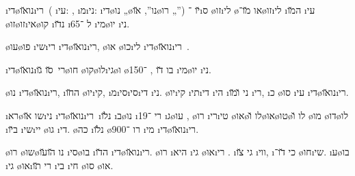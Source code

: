 \newcommand{\dinozaurim}{\i{די}\o{נו}\u{או}\i{רי}\s{ם}}

\dinozaurim\ ( \i{עי}: , \i{מ}\i{ני}:  \i{די}\o{נו} „\o{נו}”,  \u{או}\o{רו} „”) \u{יו} ־\i{ס}  \o{זו}\i{לי} \o{או} \u{מו}־\o{זו}\i{לי} \i{ה}\u{מו} \i{עי} \o{זו}\o{זו}\i{אי}\o{קו} \i{נ}\u{דו} \i{ל} ־65 \i{מי}\o{יו} \i{ני}.

\o{עו}\o{פו}   \i{שי}\i{רי}  \dinozaurim, \o{או}  \o{כו}\i{לי}  \dinozaurim\ .

\dinozaurim\ \u{סו} \u{גו}\o{חו} \o{קו}\o{לו}\i{גי}\o{ו} \o{בו}   \u{דו} ,  ־150 \i{מי}\o{יו} \i{ני}.

\o{נו} \dinozaurim, \i{ה}\u{חו} \o{יו}\i{קי}, \i{מ}\i{סי}\i{סי}\i{די} \i{ני}. \o{יו}\i{קי} \i{תי}\i{די} \i{הי} \i{ני} \u{ו}\u{מו} \i{רי}, \i{כ}  \o{סו} \i{עי} \dinozaurim.

\i{רא}\o{שו} \u{או}\i{ני}  \dinozaurim\ \i{נ}\u{לו} \i{ב}\o{נו} \i{רי}   ־19   \i{ג}\o{עו} , \o{רו} \i{רי}\i{טי}  \o{או}\o{לו} \u{ו}\o{או}\o{טו}\o{לו} \u{ו} \o{מו} \o{דו}\o{לו} \i{ב}\u{יו} \i{שי}\i{יי} \o{גו}  \i{די}.
 \o{כה} \i{נ}\u{לו} \o{רו} ־900 \i{מי} \dinozaurim.

\o{רו} \o{שו}\o{נו} \u{הו}\u{עו}  \i{סי}\o{בו} \i{ה}\u{דו}  \dinozaurim. \o{רו}  \i{היא} \i{גי} \o{או}\i{רי} . \i{גי}     \u{צו} \i{ווי},  \i{כי}  \u{דו}־      \o{חו}\i{שי}. \i{ע}\o{בו} \i{גי} \o{או}\i{רי} \u{תו} \i{בי} \i{חי}  \o{סו} \o{או}.

